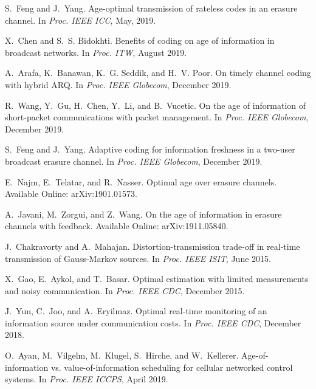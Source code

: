 \documentclass[12pt,journal,onecolumn]{IEEEtran}
\begin{document}
\begin{thebibliography}{10}
S.~Feng and J.~Yang.
\newblock Age-optimal transmission of rateless codes in an erasure channel.
\newblock In {\em Proc. IEEE ICC}, May, 2019.

X.~Chen and S.~S. Bidokhti.
\newblock Benefits of coding on age of information in broadcast networks.
\newblock In {\em Proc. ITW}, August 2019.

A.~Arafa, K.~Banawan, K.~G. Seddik, and H.~V. Poor.
\newblock On timely channel coding with hybrid {ARQ}.
\newblock In {\em Proc. IEEE Globecom}, December 2019.

R.~Wang, Y.~Gu, H.~Chen, Y.~Li, and B.~Vucetic.
\newblock On the age of information of short-packet communications with packet
  management.
\newblock In {\em Proc. IEEE Globecom}, December 2019.

S.~Feng and J.~Yang.
\newblock Adaptive coding for information freshness in a two-user broadcast
  erasure channel.
\newblock In {\em Proc. IEEE Globecom}, December 2019.

E.~Najm, E.~Telatar, and R.~Nasser.
\newblock Optimal age over erasure channels.
\newblock Available Online: ar{X}iv:1901.01573.

A.~Javani, M.~Zorgui, and Z.~Wang.
\newblock On the age of information in erasure channels with feedback.
\newblock Available Online: ar{X}iv:1911.05840.

J.~Chakravorty and A.~Mahajan.
\newblock Distortion-transmission trade-off in real-time transmission of
  {G}auss-{M}arkov sources.
\newblock In {\em Proc. IEEE ISIT}, June 2015.

X.~Gao, E.~Aykol, and T.~Basar.
\newblock Optimal estimation with limited measurements and noisy communication.
\newblock In {\em Proc. IEEE CDC}, December 2015.

J.~Yun, C.~Joo, and A.~Eryilmaz.
\newblock Optimal real-time monitoring of an information source under
  communication costs.
\newblock In {\em Proc. IEEE CDC}, December 2018.

O.~Ayan, M.~Vilgelm, M.~Klugel, S.~Hirche, and W.~Kellerer.
\newblock Age-of-information vs. value-of-information scheduling for cellular
  networked control systems.
\newblock In {\em Proc. IEEE ICCPS}, April 2019.


\end{thebibliography}
\end{document}
